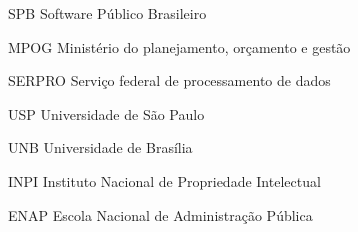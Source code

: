 \begin{siglas}
  \item[SPB] Software Público Brasileiro
  \item[MPOG] Ministério do planejamento, orçamento e gestão
  \item[SERPRO] Serviço federal de processamento de dados
  \item[USP] Universidade de São Paulo
  \item[UNB] Universidade de Brasília
  \item[INPI] Instituto Nacional de Propriedade Intelectual
  \item[ENAP] Escola Nacional de Administração Pública
\end{siglas}
